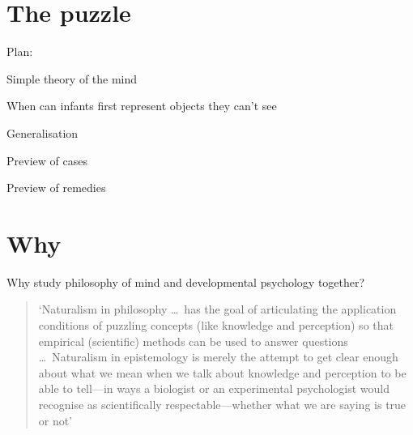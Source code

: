 \documentclass[12pt,\papersize]{extarticle}
\date{}
\begin{document}
\setlength\footnotesep{1em}




\maketitle

\begin{abstract}
\noindent
***
\end{abstract}


\section{The puzzle}
\label{sec:puzzle}

Plan:

Simple theory of the mind

When can infants first represent objects they can't see

Generalisation

Preview of cases

Preview of remedies


\section{Why}
Why study philosophy of mind and developmental psychology together?

\begin{quote}
`Naturalism in philosophy …\ has the goal of articulating the application conditions of puzzling concepts (like knowledge and perception) so that empirical (scientific) methods can be used to answer questions  …\ Naturalism in epistemology is merely the attempt to get clear enough about what we mean when we talk about knowledge and perception to be able to tell—in ways a biologist or an experimental psychologist would recognise as scientifically respectable—whether what we are saying is true or not' \citep[p.\ x]{Dretske:2000ky}
\end{quote}


\end{document}
